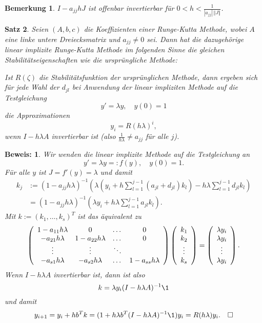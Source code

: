 \documentclass[
]{mycourse}
\theoremstyle{mythm}
\newtheorem{theorem}{Satz}[chapter]
\newtheorem{bemerkung}[theorem]{Bemerkung}
\theoremstyle{break}
\newtheorem*{beweis}{Beweis:}
\newcommand{\norm}[1]{\left\Vert#1\right\Vert}		%
\begin{document}
\begin{bemerkung}\label{rem:LinImpl_invertible}
$I-a_{jj} hJ$ ist offenbar invertierbar für $0<h<\frac{1}{|a_{jj}|\, \norm{J}}$.
\end{bemerkung}

\begin{theorem}\label{thm:lin_impl_stab}
Seien $(A,b,c)$ die Koeffizienten einer Runge-Kutta Methode, wobei $A$ eine linke untere Dreiecksmatrix und $a_{jj}\neq 0$ sei. Dann hat die dazugehörige linear implizite Runge-Kutta Methode im folgenden Sinne die gleichen Stabilitätseigenschaften wie die ursprüngliche Methode:

Ist $R(\zeta)$ die Stabilitätsfunktion der ursprünglichen Methode, dann ergeben sich für jede Wahl der $d_{jl}$ bei Anwendung der linear impliziten Methode auf die Testgleichung
\[
y'=\lambda y, \quad y(0)=1
\]
die Approximationen
\[
y_i=R(h\lambda)^i,
\]
wenn $I-h\lambda A$ invertierbar ist (also $\frac{1}{h\lambda}\neq a_{jj}$ für alle $j$).
\end{theorem}
\begin{beweis}
Wir wenden die linear implizite Methode auf die Testgleichung an
\[
y'=\lambda y=:f(y), \quad y(0)=1.
\]
Für alle $y$ ist $J=f'(y)=\lambda$ und damit
\begin{align*}
k_j &:=  (1- a_{jj} h \lambda)^{-1} \left( \lambda(y_i + h \sum_{l=1}^{j-1} (a_{jl}+d_{jl}) k_l ) - h \lambda \sum_{l=1}^{j-1} d_{jl} k_l \right)\\
&= (1- a_{jj} h \lambda)^{-1} \left( \lambda y_i + h \lambda \sum_{l=1}^{j-1} a_{jl} k_l  \right).
\end{align*}
Mit $k:=(k_1,\ldots,k_s)^T$ ist das äquivalent zu
\[
\left( \begin{array}{c c c c}
1-a_{11}h\lambda & 0 & \dots & 0\\
-a_{21} h\lambda & 1-a_{22}h\lambda & \dots & 0\\
\vdots & \vdots & \ddots \\
-a_{s1} h\lambda & -a_{s2} h\lambda &  \dots & 1-a_{ss}h\lambda
\end{array}\right)
\left( \begin{array}{c} k_1\\ k_2\\ \vdots \\ k_s \end{array} \right)
= \left( \begin{array}{c} \lambda y_i\\ \lambda y_i\\ \vdots \\ \lambda y_i \end{array} \right).
\]
Wenn $I-h\lambda A$ invertierbar ist, dann ist also
\[
k=\lambda y_i (I-h\lambda A)^{-1}  \1
\]
und damit
\[
y_{i+1}=y_i+h b^T k=(1+ h \lambda b^T(I-h\lambda A)^{-1} \1)y_i=R(h\lambda)y_i.\quad \Box
\]
\end{beweis}
\end{document}
